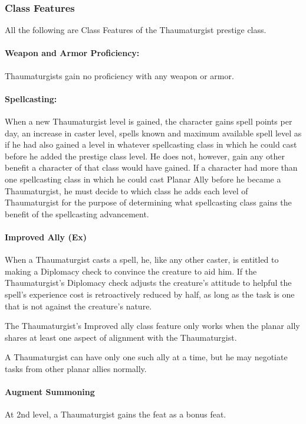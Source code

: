 \subsubsection{Class Features}
All the following are Class Features of the Thaumaturgist prestige class.

\paragraph{Weapon and Armor Proficiency:} Thaumaturgists gain no proficiency with any weapon or armor.

\paragraph{Spellcasting:} When a new Thaumaturgist level is gained, the character gains spell points per day, an increase in caster level, spells known and maximum available spell level as if he had also gained a level in whatever spellcasting class in which he could cast  before he added the prestige class level. 
He does not, however, gain any other benefit a character of that class would have gained. 
If a character had more than one spellcasting class in which he could cast Planar Ally before he became a Thaumaturgist, he must decide to which class he adds each level of Thaumaturgist for the purpose of determining what spellcasting class gains the benefit of the spellcasting advancement.

\paragraph{Improved Ally (Ex)}
When a Thaumaturgist casts a  spell, he, like any other caster, is entitled to making a Diplomacy check to convince the creature to aid him. If the Thaumaturgist's Diplomacy check adjusts the creature's attitude to helpful the spell's experience cost is retroactively reduced by half, as long as the task is one that is not against the creature's nature.

The Thaumaturgist's Improved ally class feature only works when the planar ally shares at least one aspect of alignment with the Thaumaturgist.

A Thaumaturgist can have only one such ally at a time, but he may negotiate tasks from other planar allies normally.

\paragraph{Augment Summoning}
At 2nd level, a Thaumaturgist gains the  feat as a bonus feat.


